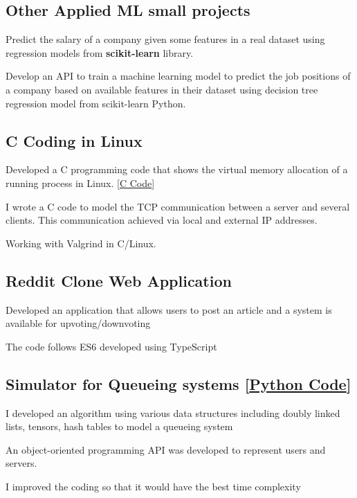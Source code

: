 \documentclass[letter,11pt]{article}
\begin{document}
\subsection{Other Applied ML small projects}
\begin{zitemize}
	\item Predict the salary of a company given some features in a real dataset using regression models from \textbf{scikit-learn} library.
	\item Develop an API to train a machine learning model to predict the job positions of a company based on available features in their dataset using decision tree regression model from scikit-learn Python.
\end{zitemize}

\subsection{C Coding in Linux}
\begin{zitemize}
	\item Developed a C programming code that shows the virtual memory allocation of a running process in Linux. [\href{https://github.com/Hadi2525/vmemory_maps}{C Code}]
	\item I wrote a C code to model the TCP communication between a server and several clients. This communication achieved via local and external IP addresses.
	\item Working with Valgrind in C/Linux.
\end{zitemize}
\subsection{Reddit Clone Web Application}
\begin{zitemize}
	\item Developed an application that allows users to post an article and a system is available for upvoting/downvoting
	\item The code follows ES6 developed using TypeScript
\end{zitemize}
\subsection{Simulator for Queueing systems [\href{https://github.com/Hadi2525/queueing_theory}{Python Code}]}
\begin{zitemize}
	\item I developed an algorithm using various data structures including doubly linked lists, tensors, hash tables to model a queueing system
	\item An object-oriented programming API was developed to represent users and servers.
	\item I improved the coding so that it would have the best time complexity 
\end{zitemize}
\end{document}
